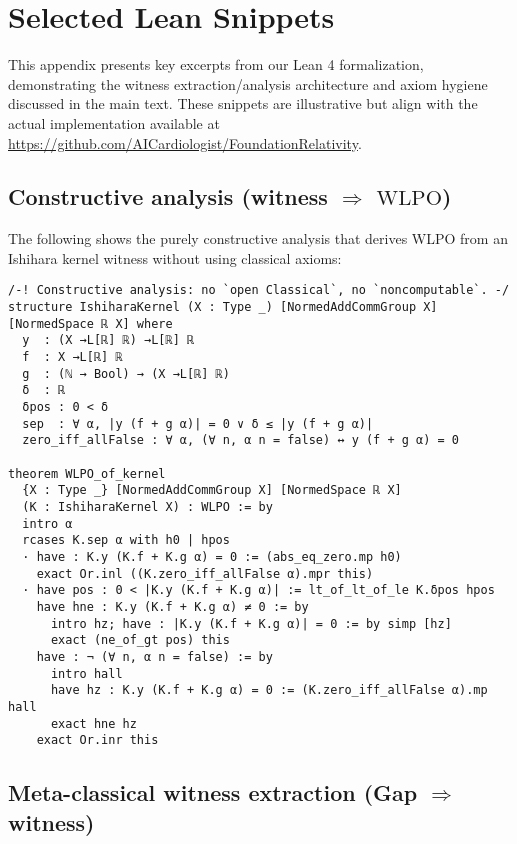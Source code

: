 \documentclass[11pt]{article}
\newcommand{\leanRepo}{\url{https://github.com/AICardiologist/FoundationRelativity}}
\newcommand{\WLPO}{\mathrm{WLPO}}
\begin{document}

\appendix

\section{Selected Lean Snippets}

This appendix presents key excerpts from our Lean 4 formalization, demonstrating the witness extraction/analysis architecture and axiom hygiene discussed in the main text. These snippets are illustrative but align with the actual implementation available at \leanRepo.

\subsection{Constructive analysis (witness $\Rightarrow$ \texorpdfstring{$\WLPO$}{WLPO})}

The following shows the purely constructive analysis that derives WLPO from an Ishihara kernel witness without using classical axioms:

\begin{lstlisting}[caption={Constructive analysis of a witness: no classical axioms},label={lst:consumer}]
/-! Constructive analysis: no `open Classical`, no `noncomputable`. -/
structure IshiharaKernel (X : Type _) [NormedAddCommGroup X] [NormedSpace ℝ X] where
  y  : (X →L[ℝ] ℝ) →L[ℝ] ℝ
  f  : X →L[ℝ] ℝ
  g  : (ℕ → Bool) → (X →L[ℝ] ℝ)
  δ  : ℝ
  δpos : 0 < δ
  sep  : ∀ α, |y (f + g α)| = 0 ∨ δ ≤ |y (f + g α)|
  zero_iff_allFalse : ∀ α, (∀ n, α n = false) ↔ y (f + g α) = 0

theorem WLPO_of_kernel
  {X : Type _} [NormedAddCommGroup X] [NormedSpace ℝ X]
  (K : IshiharaKernel X) : WLPO := by
  intro α
  rcases K.sep α with h0 | hpos
  · have : K.y (K.f + K.g α) = 0 := (abs_eq_zero.mp h0)
    exact Or.inl ((K.zero_iff_allFalse α).mpr this)
  · have pos : 0 < |K.y (K.f + K.g α)| := lt_of_lt_of_le K.δpos hpos
    have hne : K.y (K.f + K.g α) ≠ 0 := by
      intro hz; have : |K.y (K.f + K.g α)| = 0 := by simp [hz]
      exact (ne_of_gt pos) this
    have : ¬ (∀ n, α n = false) := by
      intro hall
      have hz : K.y (K.f + K.g α) = 0 := (K.zero_iff_allFalse α).mp hall
      exact hne hz
    exact Or.inr this
\end{lstlisting}

\subsection{Meta-classical witness extraction (Gap $\Rightarrow$ witness)}
\end{document}
